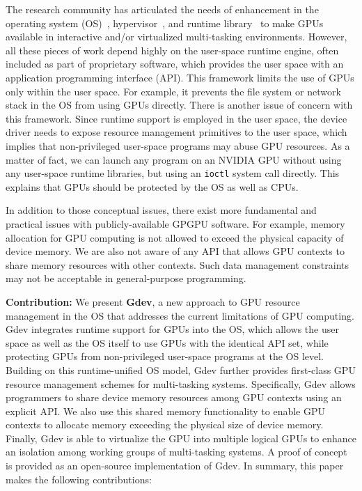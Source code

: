 The research community has articulated the needs of enhancement in 
the operating system (OS)~\cite{Bautin_MCNC08, Kato_ATC11,
Rossbach_SOSP11}, hypervisor~\cite{Gupta_ATC11}, and runtime
library~\cite{Kato_RTSS11} to make GPUs available in interactive
and/or virtualized multi-tasking environments.
However, all these pieces of work depend highly on the user-space runtime
engine, often included as part of proprietary software, which provides
the user space with an application programming interface (API).
This framework limits the use of GPUs only within the user space.
For example, it prevents the file system or network stack in the OS from
using GPUs directly.
There is another issue of concern with this framework.
Since runtime support is employed in the user space, the device
driver needs to expose resource management primitives to the user space,
which implies that non-privileged user-space programs may abuse GPU
resources.
As a matter of fact, we can launch any program on an NVIDIA GPU without
using any user-space runtime libraries, but using an \texttt{ioctl}
system call directly. 
This explains that GPUs should be protected by the OS as well as CPUs.

In addition to those conceptual issues, there exist more fundamental and
practical issues with publicly-available GPGPU software.
For example, memory allocation for GPU computing is not allowed to
exceed the physical capacity of device memory.
We are also not aware of any API that allows GPU contexts to share
memory resources with other contexts.
Such data management constraints may not be acceptable in
general-purpose programming.

\textbf{Contribution:}
We present \textbf{Gdev}, a new approach to GPU resource management in
the OS that
addresses the current limitations of GPU computing.
Gdev integrates runtime support for GPUs into the OS, which allows the
user space as well as the OS itself to use GPUs with the identical API
set, while protecting GPUs from non-privileged user-space programs at
the OS level.
Building on this runtime-unified OS model, Gdev further provides
first-class GPU resource management schemes for multi-tasking systems.
Specifically, Gdev allows programmers to share device memory resources
among GPU contexts using an explicit API.
We also use this shared memory functionality to enable GPU contexts to
allocate memory exceeding the physical size of device memory.
Finally, Gdev is able to virtualize the GPU into multiple logical
GPUs to enhance an isolation among working groups of multi-tasking
systems.
A proof of concept is provided as an open-source implementation of Gdev.
In summary, this paper makes the following contributions:

